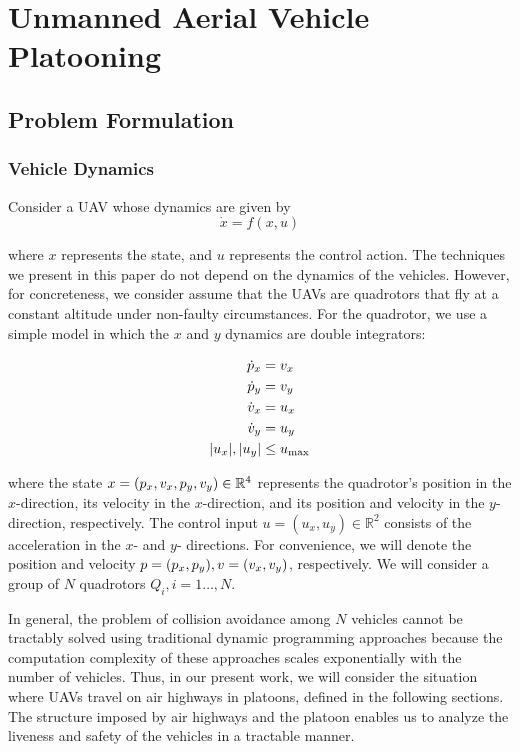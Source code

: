 \section{Unmanned Aerial Vehicle Platooning \label{sec:platooning}}
\subsection{Problem Formulation}
\subsubsection{Vehicle Dynamics}
Consider a UAV whose dynamics are given by
\begin{equation}
\dot{x} = f(x,u)
\end{equation}

\noindent where $x$ represents the state, and $u$ represents the control action. The techniques we present in this paper do not depend on the dynamics of the vehicles. However, for concreteness, we consider assume that the UAVs are quadrotors that fly at a constant altitude under non-faulty circumstances. For the quadrotor, we use a simple model in which the $x$ and $y$ dynamics are double integrators:

\begin{equation} \label{eq:dyn}
\begin{aligned}
\dot{p}_x &= v_x \\
\dot{p}_y &= v_y  \\
\dot{v}_x &= u_x \\
\dot{v}_y &= u_y \\
|u_x|,|u_y| &\le u_\text{max}
\end{aligned}
\end{equation}

\noindent where the state $x=(p_x, v_x, p_y, v_y)\in\mathbb{R}^4$ represents the quadrotor's position in the $x$-direction, its velocity in the $x$-direction, and its position and velocity in the $y$-direction, respectively. The control input $u = (u_x, u_y)\in\mathbb{R}^2$ consists of the acceleration in the $x$- and $y$- directions. For convenience, we will denote the position and velocity $p=(p_x, p_y),v=(v_x,v_y)$, respectively. We will consider a group of $N$ quadrotors $Q_i, i=1\ldots,N$.

In general, the problem of collision avoidance among $N$ vehicles cannot be tractably solved using traditional dynamic programming approaches because the computation complexity of these approaches scales exponentially with the number of vehicles. Thus, in our present work, we will consider the situation where UAVs travel on air highways in platoons, defined in the following sections. The structure imposed by air highways and the platoon enables us to analyze the liveness and safety of the vehicles in a tractable manner.

